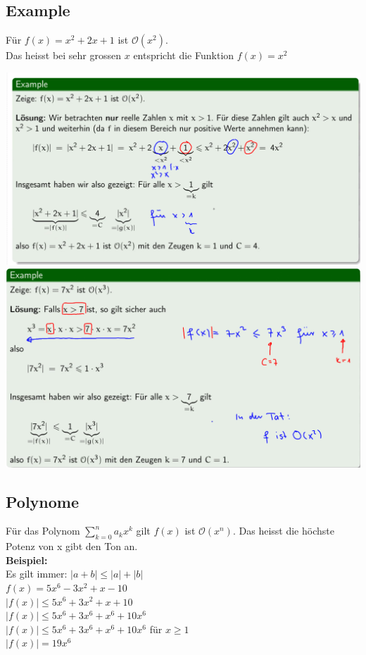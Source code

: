 \documentclass[12pt]{scrartcl}
\begin{document}
\subsection{Example}
Für $f(x) = x^2 + 2x + 1$ ist $\mathcal{O}(x^2)$.\\
Das heisst bei sehr grossen $x$ entspricht die Funktion $f(x) =  x^2$

\includegraphics[width=15cm]{img/wachstum_example_1.png}
\newpage
\includegraphics[width=15cm]{img/wachstum_example_2.png}


\subsection{Polynome}
Für das Polynom $\sum_{k=0}^n a_k x^k$ gilt $f(x)$ ist $\mathcal{O}(x^n)$. Das heisst
die höchste Potenz von x gibt den Ton an.\\

\textbf{Beispiel:}\\
Es gilt immer: $|a + b| \leq |a| + |b|$\\

$f(x) = 5x^6 - 3x^2 + x - 10$\\
$|f(x)| \leqslant 5x^6 + 3x^2 + x + 10$\\
$|f(x)| \leqslant 5x^6 + 3x^6 + x^6 + 10x^6$\\
$|f(x)| \leqslant 5x^6 + 3x^6 + x^6 + 10x^6$ für $x \geqslant 1$\\
$|f(x)| = 19x^6$\\
\end{document}
